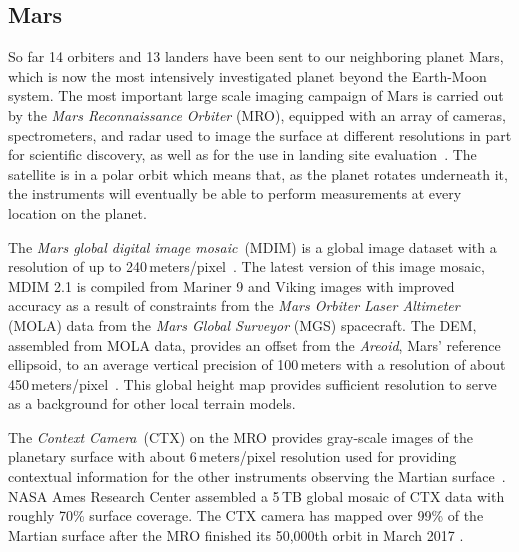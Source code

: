 \documentclass[journal]{vgtc}                %
\begin{document}

\subsection{Mars} \label{sec:scenario:mars}
So far 14 orbiters and 13 landers have been sent to our neighboring planet Mars, which is now the most intensively investigated planet beyond the Earth-Moon system.
The most important large scale imaging campaign of Mars is carried out by the \emph{Mars Reconnaissance Orbiter} (MRO), equipped with an array of cameras, spectrometers, and radar used to image the surface at different resolutions in part for scientific discovery, as well as for the use in landing site evaluation~\cite{zurek2007overview}.
The satellite is in a polar orbit which means that, as the planet rotates underneath it, the instruments will eventually be able to perform measurements at every location on the planet.

The \emph{Mars global digital image mosaic}~(MDIM) is a global image dataset with a resolution of up to 240\,meters/pixel~\cite{archinal2003mars}.
The latest version of this image mosaic, MDIM 2.1 is compiled from Mariner 9 and Viking images with improved accuracy as a result of constraints from the \emph{Mars Orbiter Laser Altimeter} (MOLA) data from the \emph{Mars Global Surveyor} (MGS) spacecraft.
The DEM, assembled from MOLA data, provides an offset from the \emph{Areoid}, Mars' reference ellipsoid, to an average vertical precision of 100\,meters with a resolution of about 450\,meters/pixel~\cite{smith2001mars}.
This global height map provides sufficient resolution to serve as a background for other local terrain models.

The \emph{Context Camera}~(CTX) on the MRO provides gray-scale images of the planetary surface with about 6\,meters/pixel resolution used for providing contextual information for the other instruments observing the Martian surface~\cite{zurek2007overview}.
NASA Ames Research Center assembled a 5\,TB global mosaic of CTX data with roughly 70\% surface coverage.
The CTX camera has mapped over 99\% of the Martian surface after the MRO finished its 50,000th orbit in March 2017 \cite{mroorbit}.
\end{document}
